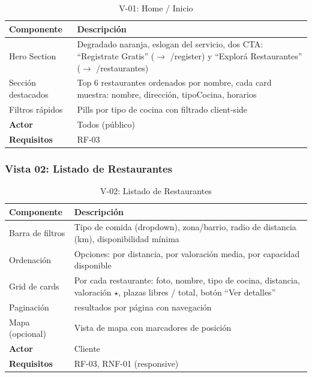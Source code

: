 \begin{table}[H]
    \centering
    \caption{V-01: Home / Inicio}
    \label{tab:vista01}
    \begin{tabular}{|>{\raggedright\arraybackslash}p{}|>{\raggedright\arraybackslash}p{}|}
        \hline
        \textbf{Componente} & \textbf{Descripción} \\
        \hline
        Hero Section & Degradado naranja, eslogan del servicio, dos CTA: ``Registrate Gratis'' (\(\rightarrow\) /register) y ``Explorá Restaurantes'' (\(\rightarrow\) /restaurantes) \\
        \hline
        Sección destacados & Top 6 restaurantes ordenados por nombre, cada card muestra: nombre, dirección, tipoCocina, horarios \\
        \hline
        Filtros rápidos & Pills por tipo de cocina con filtrado client-side \\
        \hline
        \textbf{Actor} & Todos (público) \\
        \hline
        \textbf{Requisitos} & RF-03 \\
        \hline
    \end{tabular}
\end{table}

\subsubsection{Vista 02: Listado de Restaurantes}

\begin{table}[H]
    \centering
    \caption{V-02: Listado de Restaurantes}
    \label{tab:vista02}
    \begin{tabular}{|>{\raggedright\arraybackslash}p{}|>{\raggedright\arraybackslash}p{}|}
        \hline
        \textbf{Componente} & \textbf{Descripción} \\
        \hline
        Barra de filtros & Tipo de comida (dropdown), zona/barrio, radio de distancia (km), disponibilidad mínima \\
        \hline
        Ordenación & Opciones: por distancia, por valoración media, por capacidad disponible \\
        \hline
        Grid de cards & Por cada restaurante: foto, nombre, tipo de cocina, distancia, valoración $\star$, plazas libres / total, botón ``Ver detalles'' \\
        \hline
        Paginación & 10 resultados por página con navegación \\
        \hline
        Mapa (opcional) & Vista de mapa con marcadores de posición \\
        \hline
        \textbf{Actor} & Cliente \\
        \hline
        \textbf{Requisitos} & RF-03, RNF-01 (responsive) \\
        \hline
    \end{tabular}
\end{table}

